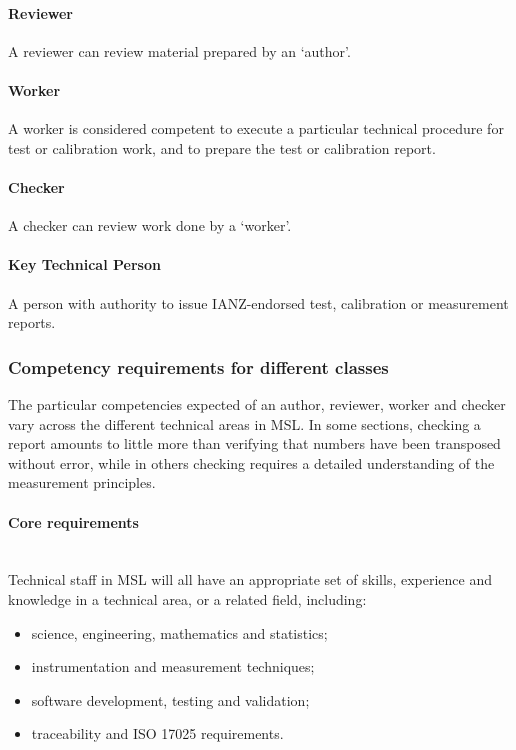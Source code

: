 \paragraph{Reviewer}
A reviewer can review material prepared by an ‘author'. 

\paragraph{Worker}
A worker is considered competent to execute a particular technical procedure for test or calibration work, and to prepare the test or calibration report.

\paragraph{Checker}
A checker can review work done by a ‘worker'.

\paragraph{Key Technical Person}
A person with authority to issue IANZ-endorsed test, calibration or measurement reports.

\subsubsection{Competency requirements for different classes}
The particular competencies expected of an author, reviewer, worker and checker vary across the different technical areas in MSL. In some sections, checking a report amounts to little more than verifying that numbers have been transposed without error, while in others checking requires a detailed understanding of the measurement principles. 

\paragraph{Core requirements} \mbox{}\\
Technical staff in MSL will all have an appropriate set of skills, experience and knowledge in a technical area, or a related field, including:
\begin{itemize}
\item science, engineering, mathematics and statistics;
\item instrumentation and measurement techniques;
\item software development, testing and validation;
\item traceability and ISO 17025 requirements.
\end{itemize}
 
